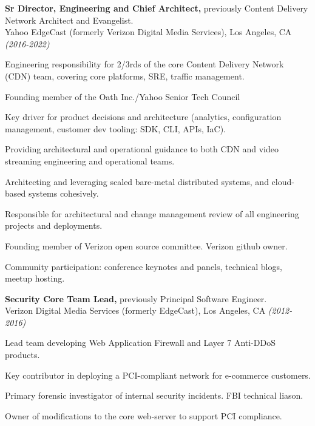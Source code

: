\documentclass[margin]{res}
\begin{document}
\begin{resume}
{\bf Sr Director, Engineering and Chief Architect,} previously Content Delivery Network Architect and Evangelist.\\
Yahoo EdgeCast (formerly Verizon Digital Media Services), Los Angeles, CA {\em (2016-2022)}
\begin{list}{}{\leftmargin=1.5em \topsep=5pt \partopsep=0pt \parsep=2.5pt}
  \item Engineering responsibility for 2/3rds of the core Content Delivery Network (CDN) team, covering core platforms, SRE, traffic management.
  \item Founding member of the Oath Inc./Yahoo Senior Tech Council
  \item Key driver for product decisions and architecture (analytics, configuration management, customer dev tooling: SDK, CLI, APIs, IaC).
  \item Providing architectural and operational guidance to both CDN and video streaming engineering and operational teams.
  \item Architecting and leveraging scaled bare-metal distributed systems, and cloud-based systems cohesively.
  \item Responsible for architectural and change management review of all engineering projects and deployments.
  \item Founding member of Verizon open source committee.  Verizon github owner.
  \item Community participation: conference keynotes and panels, technical blogs, meetup hosting.
\end{list}

{\bf Security Core Team Lead,} previously Principal Software Engineer.\\
Verizon Digital Media Services (formerly EdgeCast), Los Angeles, CA {\em (2012-2016)}
\begin{list}{}{\leftmargin=1.5em \topsep=5pt \partopsep=0pt \parsep=2.5pt}
  \item Lead team developing Web Application Firewall and Layer 7
    Anti-DDoS products.
  \item Key contributor in deploying a PCI-compliant network for e-commerce customers.
  \item Primary forensic investigator of internal security incidents.
    FBI technical liason.
  \item Owner of modifications to the core web-server to support PCI
    compliance.
\end{list}


\end{resume}
\end{document}
